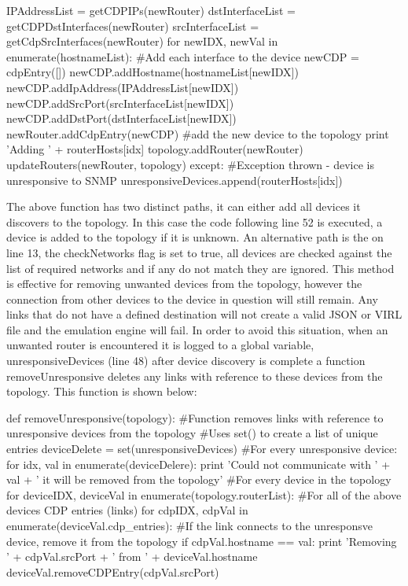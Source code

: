 \documentclass[11pt]{report}
\begin{document}
\begin{python}
			IPAddressList = getCDPIPs(newRouter)
			dstInterfaceList = getCDPDstInterfaces(newRouter)
			srcInterfaceList = getCdpSrcInterfaces(newRouter)
			for newIDX, newVal in enumerate(hostnameList):
				#Add each interface to the device
				newCDP = cdpEntry([])
				newCDP.addHostname(hostnameList[newIDX])
				newCDP.addIpAddress(IPAddressList[newIDX])
				newCDP.addSrcPort(srcInterfaceList[newIDX])
				newCDP.addDstPort(dstInterfaceList[newIDX])
				newRouter.addCdpEntry(newCDP)
			#add the new device to the topology
			print 'Adding ' + routerHosts[idx]
			topology.addRouter(newRouter)
			updateRouters(newRouter, topology)
		except:
			#Exception thrown - device is unresponsive to SNMP
			unresponsiveDevices.append(routerHosts[idx])
\end{python}

The above function has two distinct paths, it can either add all devices it discovers to the topology. In this case the code following line 52 is executed, a device is added to the topology if it is unknown. An alternative path is the on line 13, the checkNetworks flag is set to true, all devices are checked against the list of required networks and if any do not match they are ignored. This method is effective for removing unwanted devices from the topology, however the connection from other devices to the device in question will still remain. Any links that do not have a defined destination will not create a valid JSON or VIRL file and the emulation engine will fail. In order to avoid this situation, when an unwanted router is encountered it is logged to a global variable, unresponsiveDevices (line 48) after device discovery is complete a function removeUnresponsive deletes any links with reference to these devices from the topology. This function is shown below:

\begin{python}
def removeUnresponsive(topology):
	#Function removes links with reference to unresponsive devices from the topology
	#Uses set() to create a list of unique entries
	deviceDelete = set(unresponsiveDevices)
	#For every unresponsive device:
	for idx, val in enumerate(deviceDelere):
		print 'Could not communicate with ' + val + ' it will be removed from the topology'
		#For every device in the topology
		for deviceIDX, deviceVal in enumerate(topology.routerList):
			#For all of the above devices CDP entries (links)
			for cdpIDX, cdpVal in enumerate(deviceVal.cdp_entries):
				#If the link connects to the unresponsve device, remove it from the topology
				if cdpVal.hostname == val:
					print 'Removing ' + cdpVal.srcPort + ' from ' + deviceVal.hostname
					deviceVal.removeCDPEntry(cdpVal.srcPort)
\end{python}
\end{document}
